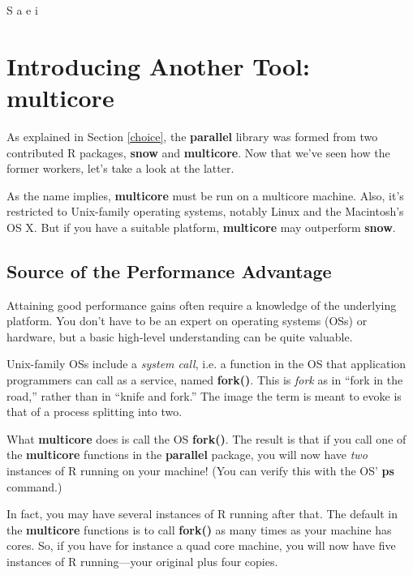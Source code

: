 S%
a%
e%
i%

\section{Introducing Another Tool:  multicore}

As explained in Section \ref{choice}, the {\bf parallel} library was
formed from two contributed R packages, {\bf snow} and {\bf multicore}.
Now that we've seen how the former workers, let's take a look at the
latter.

As the name implies, {\bf multicore} must be run on a multicore machine.
Also, it's restricted to Unix-family operating systems, notably Linux
and the Macintosh's OS X.  But if you have a suitable platform, {\bf
multicore} may outperform {\bf snow}.

\subsection{Source of the Performance Advantage}

Attaining good performance gains often require a knowledge of the
underlying platform.  You don't have to be an expert on operating
systems (OSs) or hardware, but a basic high-level understanding can be
quite valuable.

Unix-family OSs include a {\it system call}, i.e. a function in the OS
that application programmers can call as a service, named {\bf fork()}.
This is {\it fork} as in ``fork in the road,'' rather than in ``knife
and fork.'' The image the term is meant to evoke is that of a process
splitting into two.

What {\bf multicore} does is call the OS {\bf fork()}.  The result is
that if you call one of the {\bf multicore} functions in the {\bf
parallel} package, you will now have {\it two} instances of R running on
your machine!  (You can verify this with the OS' {\bf ps} command.)  

In fact, you may have several instances of R running after that.  The
default in the {\bf multicore} functions is to call {\bf fork()} as many
times as your machine has cores.  So, if you have for instance a quad
core machine, you will now have five instances of R running---your
original plus four copies.

